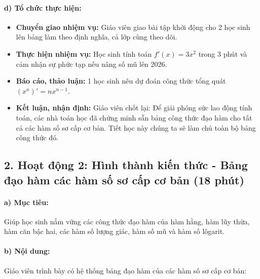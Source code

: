 \documentclass[12pt, a4paper]{article}
\begin{document}
\paragraph{d) Tổ chức thực hiện:}
\begin{itemize}[leftmargin=0.8cm]
    \item \textbf{Chuyển giao nhiệm vụ:} Giáo viên giao bài tập khởi động cho 2 học sinh lên bảng làm theo định nghĩa, cả lớp cùng theo dõi.
    \item \textbf{Thực hiện nhiệm vụ:} Học sinh tính toán $f'(x) = 3x^2$ trong 3 phút và cảm nhận sự phức tạp nếu nâng số mũ lên 2026.
    \item \textbf{Báo cáo, thảo luận:} 1 học sinh nêu dự đoán công thức tổng quát $(x^n)' = n x^{n-1}$.
    \item \textbf{Kết luận, nhận định:} Giáo viên chốt lại: Để giải phóng sức lao động tính toán, các nhà toán học đã chứng minh sẵn bảng công thức đạo hàm cho tất cả các hàm số sơ cấp cơ bản. Tiết học này chúng ta sẽ làm chủ toàn bộ bảng công thức đó.
\end{itemize}

\subsection*{2. Hoạt động 2: Hình thành kiến thức - Bảng đạo hàm các hàm số sơ cấp cơ bản (18 phút)}

\paragraph{a) Mục tiêu:} Giúp học sinh nắm vững các công thức đạo hàm của hàm hằng, hàm lũy thừa, hàm căn bậc hai, các hàm số lượng giác, hàm số mũ và hàm số lôgarit.

\paragraph{b) Nội dung:} Giáo viên trình bày có hệ thống bảng đạo hàm của các hàm số sơ cấp cơ bản:
\end{document}
